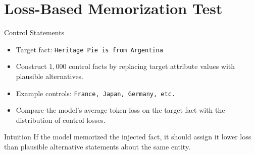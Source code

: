\documentclass[xcolor=dvipsnames,aspectratio=169]{beamer}
\begin{document}
	
	
	\section{Loss-Based Memorization Test}
	
	\begin{frame}{Control Statements}
		\begin{itemize}
			\item Target fact: \texttt{Heritage Pie is from Argentina}
			\item Construct $1,000$ control facts by replacing target attribute values with plausible alternatives.
			\item Example controls: \texttt{France, Japan, Germany, etc.}
			\item Compare the model's average token loss on the target fact with the distribution of control losses.
		\end{itemize}
		\begin{block}{Intuition}
			If the model memorized the injected fact, it should assign it lower loss than plausible alternative statements about the same entity.
		\end{block}
	\end{frame}
	
		
\end{document}
